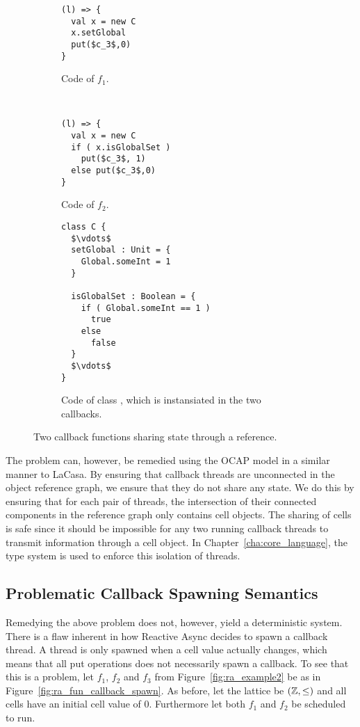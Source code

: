 \begin{figure}
  \centering
  \begin{subfigure}[b]{0.4\textwidth}
    \begin{lstlisting}
(l) => {
  val x = new C
  x.setGlobal
  put($c_3$,0)
}
    \end{lstlisting}
    \caption{Code of $f_1$.}
  \end{subfigure}
  ~
  \begin{subfigure}[b]{0.4\textwidth}
    \begin{lstlisting}
(l) => {
  val x = new C
  if ( x.isGlobalSet )
    put($c_3$, 1)
  else put($c_3$,0)
}
    \end{lstlisting}
    \caption{Code of $f_2$.}
  \end{subfigure}

  \begin{subfigure}[b]{0.5\textwidth}
    \begin{lstlisting}
class C {
  $\vdots$
  setGlobal : Unit = {
    Global.someInt = 1
  }

  isGlobalSet : Boolean = {
    if ( Global.someInt == 1 ) 
      true
    else 
      false
  }
  $\vdots$
}
    \end{lstlisting}
    \caption{Code of class , which is instansiated in the two callbacks.}
  \end{subfigure}
  \caption{Two callback functions sharing state through a reference.}
  \label{fig:ra_fun_shared_state_ref}
\end{figure}


The problem can, however, be remedied using the OCAP model in a similar manner to
LaCasa.  By ensuring that callback threads are unconnected in the object
reference graph, we ensure that they do not share any state. We do this by
ensuring that for each pair of threads, the intersection of their connected
components in the reference graph only contains cell objects. The sharing of
cells is safe since it should be impossible for any two running callback threads
to transmit information through a cell object. In
Chapter~\ref{cha:core_language}, the type system is used to enforce this
isolation of threads.

\subsection{Problematic Callback Spawning Semantics}%
\label{sub:problematic_callback_spawning_semantics}

Remedying the above problem does not, however, yield a deterministic system.
There is a flaw inherent in how Reactive Async decides to spawn a callback
thread. A thread is only spawned when a cell value actually changes, which means
that all put operations does not necessarily spawn a callback. To see that this
is a problem, let $f_1$, $f_2$ and $f_3$ from Figure~\ref{fig:ra_example2} be as in
Figure~\ref{fig:ra_fun_callback_spawn}. As before, let the lattice be
$(\mathbb{Z}, \leq)$ and all cells have an initial cell value of $0$. Furthermore
let both $f_1$ and $f_2$ be scheduled to run.

